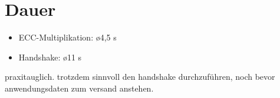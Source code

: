 \section{Dauer}

\begin{itemize}
  \item ECC-Multiplikation: \o 4,5 s
  \item Handshake: \o 11 s
\end{itemize}

praxitauglich. trotzdem sinnvoll den handshake durchzuführen, noch bevor anwendungsdaten zum versand anstehen.